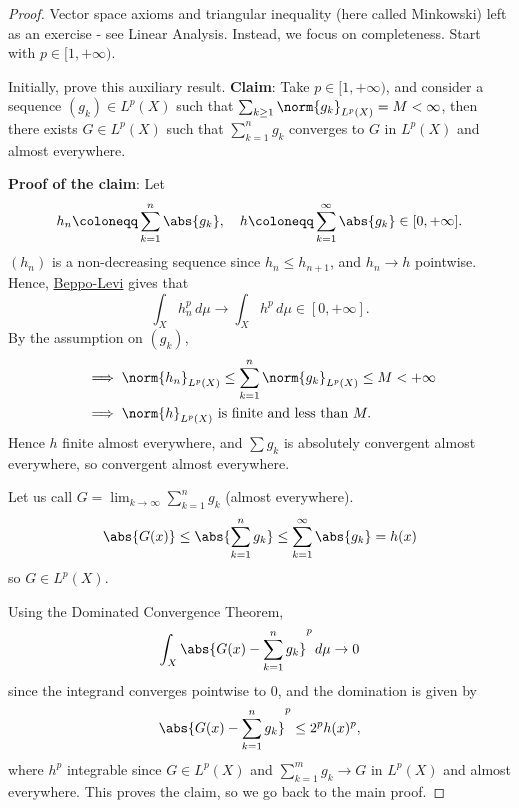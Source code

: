\documentclass[twoside]{article}
\begin{document}
\begin{proof}
    Vector space axioms and triangular inequality (here called Minkowski) left as an exercise - see Linear Analysis.
    Instead, we focus on completeness. Start with $p \in [1, +\infty)$.

    Initially, prove this auxiliary result.
    \textbf{Claim}: Take $p \in [1, +\infty)$, and consider a sequence $(g_k) \in L^p(X)$ such that $\sum_{k \geq 1} \norm{g_k}_{L^p(X)} = M < \infty$, then there exists $G \in L^p(X)$ such that $\sum_{k=1}^n g_k$ converges to $G$ in $L^p(X)$ and almost everywhere.

    \textbf{Proof of the claim}: Let
    \begin{equation*}
        h_n \coloneqq \sum_{k=1}^n \abs{g_k}, \quad h \coloneqq \sum_{k=1}^\infty \abs{g_k} \in [0, +\infty].
    \end{equation*}
    $(h_n)$ is a non-decreasing sequence since $h_n \leq h_{n+1}$, and $h_n \to h$ pointwise.
    Hence, \hyperlink{thm:Beppo}{Beppo-Levi} gives that
    \begin{equation*}
        \int_X h_n^p \, d\mu \to \int_X h^p  \, d\mu \in [0, +\infty].
    \end{equation*}
    By the assumption on $(g_k)$,
    \begin{align*}
        &\implies \norm{h_n}_{L^p(X)} \leq \sum_{k=1}^n \norm{g_k}_{L^p(X)} \leq M < +\infty \\
        &\implies \norm{h}_{L^p(X)} \text{ is finite and less than } M.
    \end{align*}
    Hence $h$ finite almost everywhere, and $\sum g_k$ is absolutely convergent almost everywhere, so convergent almost everywhere.

    Let us call $G = \lim_{k \to \infty} \sum_{k=1}^n g_k$ (almost everywhere).
    \begin{equation*}
        \abs{G(x)} \leq \abs{\sum_{k=1}^n g_k} \leq \sum_{k=1}^\infty \abs{g_k} = h(x)
    \end{equation*}
    so $G \in L^p(X)$.

    Using the Dominated Convergence Theorem,
    \begin{equation*}
        \int_X \abs{G(x) - \sum_{k=1}^n g_k}^p \, d\mu \to 0
    \end{equation*}
    since the integrand converges pointwise to 0, and the domination is given by
    \begin{equation*}\abs{G(x) - \sum_{k=1}^n g_k}^p \leq 2^p h(x)^p,\end{equation*} where $h^p$ integrable since $G \in L^p(X)$ and $\sum_{k=1}^m g_k \to G$ in $L^p(X)$ and almost everywhere.
    This proves the claim, so we go back to the main proof.


\end{proof}
\end{document}
